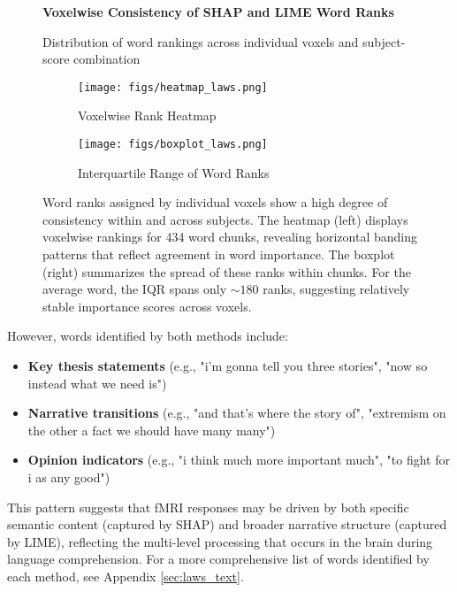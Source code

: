 \documentclass[10pt,letterpaper]{article}
\begin{document}
\begin{figure}[ht]
    \centering

    \parbox{\textwidth}{\centering 
        \fontsize{13pt}{13pt}\selectfont \textbf{Voxelwise Consistency of SHAP and LIME Word Ranks}  
        
        {\fontsize{11pt}{13pt}\selectfont Distribution of word rankings across individual voxels and subject-score combination} 
    }
    
    \begin{subfigure}[t]{0.35\textwidth}
        \centering
        \caption{Voxelwise Rank Heatmap}
        \texttt{[image: figs/heatmap\_laws.png]}
        \label{subfig:heatmap_laws}
    \end{subfigure}
    \hfill
    \begin{subfigure}[t]{0.35\textwidth}
        \centering
        \caption{Interquartile Range of Word Ranks}
        \texttt{[image: figs/boxplot\_laws.png]}
        \label{subfig:boxplot_laws}
    \end{subfigure}
    \caption{Word ranks assigned by individual voxels show a high degree of consistency within and across subjects. The heatmap (left) displays voxelwise rankings for 434 word chunks, revealing horizontal banding patterns that reflect agreement in word importance. The boxplot (right) summarizes the spread of these ranks within chunks. For the average word, the IQR spans only ${\sim}180$ ranks, suggesting relatively stable importance scores across voxels.}
    \label{fig:laws_voxelwise}
\end{figure}

\newpage

However, words identified by both methods include:
\begin{itemize}
    \item \textbf{Key thesis statements} (e.g., "i'm gonna tell you three stories", "now so instead what we need is")
    \item \textbf{Narrative transitions} (e.g., "and that's where the story of", "extremism on the other a fact we should have many many")
    \item \textbf{Opinion indicators} (e.g., "i think much more important much", "to fight for i as any good")
\end{itemize}

This pattern suggests that fMRI responses may be driven by both specific semantic content (captured by SHAP) and broader narrative structure (captured by LIME), reflecting the multi-level processing that occurs in the brain during language comprehension. For a more comprehensive list of words identified by each method, see Appendix \ref{sec:laws_text}.
\end{document}
